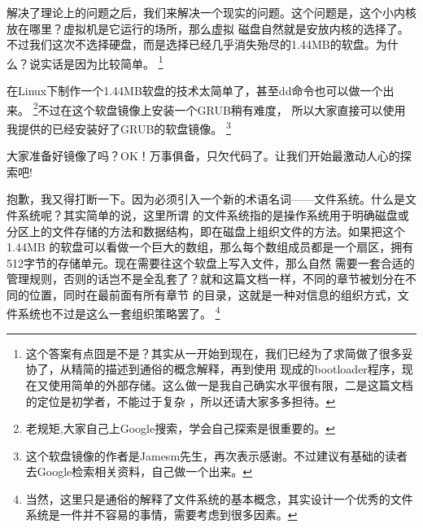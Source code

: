\par 解决了理论上的问题之后，我们来解决一个现实的问题。这个问题是，这个小内核放在哪里？虚拟机是它运行的场所，那么虚拟\allowbreak
磁盘自然就是安放内核的选择了。不过我们这次不选择硬盘，而是选择已经几乎消失殆尽的1.44MB的软盘。为什么？说实话是因为比较简单。\allowbreak
\footnote{这个答案有点囧是不是？其实从一开始到现在，我们已经为了求简做了很多妥协了，从精简的描述到通俗的概念解释，再到使用\allowbreak
现成的bootloader程序，现在又使用简单的外部存储。这么做一是我自己确实水平很有限，二是这篇文档的定位是初学者，不能过于复杂\allowbreak
，所以还请大家多多担待。}

\par 在Linux下制作一个1.44MB软盘的技术太简单了，甚至dd命令也可以做一个出来。\allowbreak
\footnote{老规矩,大家自己上Google搜索，学会自己探索是很重要的。}不过在这个软盘镜像上安装一个GRUB稍有难度，\allowbreak
所以大家直接可以使用我提供的已经安装好了GRUB的软盘镜像。\allowbreak
\footnote{这个软盘镜像的作者是Jamesm先生，再次表示感谢。不过建议有基础的读者去Google检索相关资料，自己做一个出来。}

\par 大家准备好镜像了吗？OK！万事俱备，只欠代码了。让我们开始最激动人心的探索吧!
\par 抱歉，我又得打断一下。因为必须引入一个新的术语名词——文件系统。什么是文件系统呢？其实简单的说，这里所谓\allowbreak
的文件系统指的是操作系统用于明确磁盘或分区上的文件存储的方法和数据结构，即在磁盘上组织文件的方法。如果把这个1.44MB\allowbreak
的软盘可以看做一个巨大的数组，那么每个数组成员都是一个扇区，拥有512字节的存储单元。现在需要往这个软盘上写入文件，那么自然\allowbreak
需要一套合适的管理规则，否则的话岂不是全乱套了？就和这篇文档一样，不同的章节被划分在不同的位置，同时在最前面有所有章节\allowbreak
的目录，这就是一种对信息的组织方式，文件系统也不过是这么一套组织策略罢了。\allowbreak
\footnote{当然，这里只是通俗的解释了文件系统的基本概念，其实设计一个优秀的文件系统是一件并不容易的事情，需要考虑到很多因素。}

